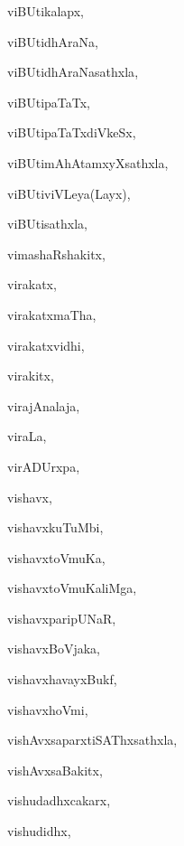 \begin{multicols}{3}
{\noindent
{viBUtikalapx}, \pageref{viBUtikalapx}

\noindent
{viBUtidhAraNa}, \pageref{viBUtidhAraNa}

\noindent
{viBUtidhAraNasathxla}, \pageref{viBUtidhAraNasathxla}

\noindent
{viBUtipaTaTx}, \pageref{viBUtipaTaTx}

\noindent
{viBUtipaTaTxdiVkeSx}, \pageref{viBUtipaTaTxdiVkeSx}

\noindent
{viBUtimAhAtamxyXsathxla}, \pageref{viBUtimAhAtamxyXsathxla}

\noindent
{viBUtiviVLeya(Layx)}, \pageref{viBUtiviVLeyaLayx}

\noindent
{viBUtisathxla}, \pageref{viBUtisathxla}

\noindent
{vimashaRshakitx}, \pageref{vimashaRshakitx}

\noindent
{virakatx}, \pageref{virakatx}

\noindent
{virakatxmaTha}, \pageref{virakatxmaTha}

\noindent
{virakatxvidhi}, \pageref{virakatxvidhi}

\noindent
{virakitx}, \pageref{virakitx}

\noindent
{virajAnalaja}, \pageref{virajAnalaja}

\noindent
{viraLa}, \pageref{viraLa}

\noindent
{virADUrxpa}, \pageref{virADUrxpa}

\noindent
{vishavx}, \pageref{vishavx}

\noindent
{vishavxkuTuMbi}, \pageref{vishavxkuTuMbi}

\noindent
{vishavxtoVmuKa}, \pageref{vishavxtoVmuKa}

\noindent
{vishavxtoVmuKaliMga}, \pageref{vishavxtoVmuKaliMga}

\noindent
{vishavxparipUNaR}, \pageref{vishavxparipUNaR}

\noindent
{vishavxBoVjaka}, \pageref{vishavxBoVjaka}

\noindent
{vishavxhavayxBukf}, \pageref{vishavxhavayxBukf}

\noindent
{vishavxhoVmi}, \pageref{vishavxhoVmi}

\noindent
{vishAvxsaparxtiSAThxsathxla}, \pageref{vishAvxsaparxtiSAThxsathxla}

\noindent
{vishAvxsaBakitx}, \pageref{vishAvxsaBakitx}

\noindent
{vishudadhxcakarx}, \pageref{vishudadhxcakarx}

\noindent
{vishudidhx}, \pageref{vishudidhx}

}
\end{multicols}
